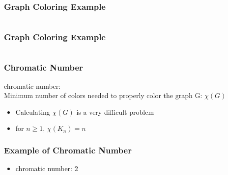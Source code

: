 \documentclass[dvipsnames]{beamer}
\begin{document}
\begin{frame}
  \frametitle{Graph Coloring Example}

  \begin{example}
    \begin{columns}
      \begin{center}
      \end{center}

      \begin{center}
      \end{center}
    \end{columns}
  \end{example}
\end{frame}

\begin{frame}
  \frametitle{Graph Coloring Example}

  \begin{example}
    \begin{columns}
      \begin{center}
      \end{center}

      \begin{center}
      \end{center}
    \end{columns}
  \end{example}
\end{frame}

\begin{frame}
  \frametitle{Chromatic Number}

  \begin{definition}
    \alert{chromatic number}:\\
      Minimum number of colors needed to properly color the graph G: $\chi (G)$
  \end{definition}

  \pause
  \begin{itemize}
     \item Calculating $\chi (G)$ is a very difficult problem
     \item for $n \geq 1$, $\chi (K_n) = n$
  \end{itemize}
\end{frame}

\begin{frame}
  \frametitle{Example of Chromatic Number}

  \begin{example}
    \begin{center}
    \end{center}

    \begin{itemize}
      \item chromatic number: 2
    \end{itemize}
  \end{example}
\end{frame}
\end{document}
